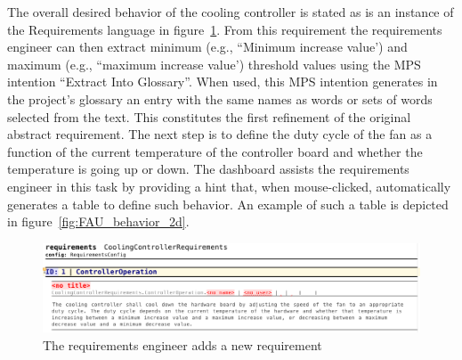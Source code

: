 The overall desired behavior of the cooling controller is stated as is an instance of the
\textsf{Requirements} language in figure~\ref{fig:new_req}. From this
requirement the requirements engineer can then extract minimum (e.g., ``Minimum
increase value') and maximum (e.g., ``maximum increase value') threshold values
using the MPS intention ``Extract Into Glossary''. When used, this MPS intention generates in the project's glossary an entry with the same names as words or sets of words
selected from the text. This constitutes the first
refinement of the original abstract requirement. The next step is to define the duty cycle of the fan as a function of the current temperature of the controller board and whether the temperature is going up or down. The dashboard assists the requirements engineer in this task by
providing a hint that, when mouse-clicked, automatically generates a table to
define such behavior. An example of such a table is depicted in
figure~\ref{fig:FAU_behavior_2d}.
 \vspace{-.5cm}
\begin{figure}[!h]
\centering 
\includegraphics[width=1\textwidth]{./figures/textReqIncomplete.png}
\vspace{-.7cm}
\caption{The requirements engineer adds a new requirement}
\label{fig:new_req}
\vspace{-.7cm}
\end{figure}

